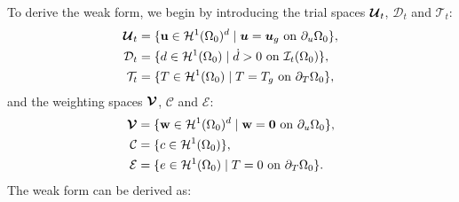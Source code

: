 To derive the weak form, we begin by introducing the trial spaces $\boldsymbol{\mathcal{U}}_t$, $\mathcal{D}_t$ and $\mathcal{T}_t$:
\begin{subequations}
  \begin{align}
    \boldsymbol{\mathcal{U}}_t & = \{ \textbf{u} \in \mathcal{H}^1(\Omega_0)^d \mid \boldsymbol{u} = \boldsymbol{u}_g \text{ on } \partial_u\Omega_0 \}, \\
    \mathcal{D}_t      & = \{ d \in \mathcal{H}^1(\Omega_0) \mid \dot{d} > 0 \text{ on } \mathcal{I}_t(\Omega_0) \},   \\
    \mathcal{T}_t      & = \{ T \in \mathcal{H}^1(\Omega_0) \mid T = T_g \text{ on } \partial_T\Omega_0 \},            
  \end{align}
\end{subequations}
and the weighting spaces $\boldsymbol{\mathcal{V}}$, $\mathcal{C}$ and $\mathcal{E}$:
\begin{subequations}
  \begin{align}
    \boldsymbol{\mathcal{V}} & = \{ \textbf{w} \in \mathcal{H}^1(\Omega_0)^d \mid \textbf{w} = \boldsymbol{0} \text{ on } \partial_u\Omega_0 \}, \\
    \mathcal{C}      & = \{ c \in \mathcal{H}^1(\Omega_0) \},                                                       \\
    \mathcal{E}      & = \{ e \in \mathcal{H}^1(\Omega_0) \mid T = 0 \text{ on } \partial_T\Omega_0 \}.              
  \end{align}
\end{subequations}
The weak form can be derived as:
